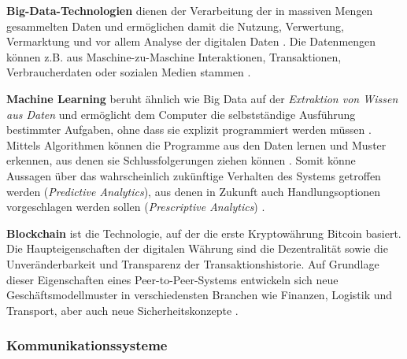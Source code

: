 \noindent\hspace*{10mm}
 \textbf{Big-Data-Technologien} dienen der Verarbeitung der in massiven Mengen gesammelten Daten und ermöglichen damit die Nutzung, Verwertung, Vermarktung und vor allem Analyse der digitalen Daten \citep{Radtke2019}. Die Datenmengen können z.B. aus Maschine-zu-Maschine Interaktionen, Transaktionen, Verbraucherdaten oder sozialen Medien stammen \citep{Elsner2018}.

 \noindent\hspace*{10mm}
 \textbf{Machine Learning} beruht ähnlich wie Big Data auf der \textit{Extraktion von Wissen aus Daten} und ermöglicht dem Computer die selbstständige Ausführung bestimmter Aufgaben, ohne dass sie explizit programmiert werden müssen \citep{Hnisch2017}. Mittels Algorithmen können die Programme aus den Daten lernen und Muster erkennen, aus denen sie Schlussfolgerungen ziehen können \citep{Elsner2018}. Somit könne Aussagen über das wahrscheinlich zukünftige Verhalten des Systems getroffen werden (\textit{Predictive Analytics}), aus denen in Zukunft auch Handlungsoptionen vorgeschlagen werden sollen (\textit{Prescriptive Analytics}) \citep{Huebschle2017}.

 \noindent\hspace*{10mm}
 \textbf{Blockchain} ist die Technologie, auf der die erste Kryptowährung Bitcoin basiert. Die Haupteigenschaften der digitalen Währung sind die Dezentralität sowie  die Unveränderbarkeit und Transparenz der Transaktionshistorie. Auf Grundlage dieser Eigenschaften eines Peer-to-Peer-Systems entwickeln sich neue Geschäftsmodellmuster in verschiedensten Branchen wie Finanzen,  Logistik und Transport, aber auch neue Sicherheitskonzepte \citep{Elsner2018}.

\subsubsection{Kommunikationssysteme}

